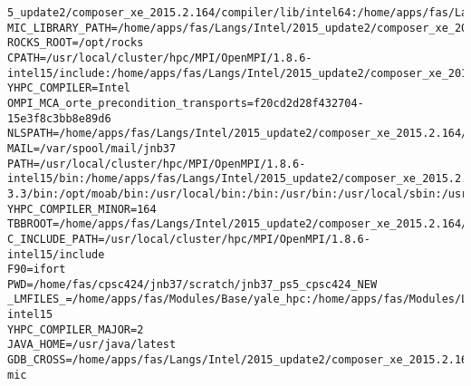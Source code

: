 \documentclass[11pt]{article}
\begin{document}
\begin{verbatim}
5_update2/composer_xe_2015.2.164/compiler/lib/intel64:/home/apps/fas/Langs/Intel/2015_update2/composer_xe_2015.2.164/mkl/lib/intel64:/home/apps/fas/Langs/Intel/2015_update2/composer_xe_2015.2.164/tbb/lib/intel64/gcc4.4:/home/apps/fas/Langs/Intel/2015_update2/composer_xe_2015.2.164/debugger/ipt/intel64/lib
MIC_LIBRARY_PATH=/home/apps/fas/Langs/Intel/2015_update2/composer_xe_2015.2.164/compiler/lib/mic:/home/apps/fas/Langs/Intel/2015_update2/composer_xe_2015.2.164/mpirt/lib/mic:/home/apps/fas/Langs/Intel/2015_update2/composer_xe_2015.2.164/tbb/lib/mic
ROCKS_ROOT=/opt/rocks
CPATH=/usr/local/cluster/hpc/MPI/OpenMPI/1.8.6-intel15/include:/home/apps/fas/Langs/Intel/2015_update2/composer_xe_2015.2.164/ipp/include:/home/apps/fas/Langs/Intel/2015_update2/composer_xe_2015.2.164/mkl/include:/home/apps/fas/Langs/Intel/2015_update2/composer_xe_2015.2.164/tbb/include
YHPC_COMPILER=Intel
OMPI_MCA_orte_precondition_transports=f20cd2d28f432704-15e3f8c3bb8e89d6
NLSPATH=/home/apps/fas/Langs/Intel/2015_update2/composer_xe_2015.2.164/compiler/lib/intel64/locale/%l_%t/%N:/home/apps/fas/Langs/Intel/2015_update2/composer_xe_2015.2.164/ipp/lib/intel64/locale/%l_%t/%N:/home/apps/fas/Langs/Intel/2015_update2/composer_xe_2015.2.164/mkl/lib/intel64/locale/%l_%t/%N:/home/apps/fas/Langs/Intel/2015_update2/composer_xe_2015.2.164/debugger/gdb/intel64_mic/share/locale/%l_%t/%N:/home/apps/fas/Langs/Intel/2015_update2/composer_xe_2015.2.164/debugger/gdb/intel64/share/locale/%l_%t/%N
MAIL=/var/spool/mail/jnb37
PATH=/usr/local/cluster/hpc/MPI/OpenMPI/1.8.6-intel15/bin:/home/apps/fas/Langs/Intel/2015_update2/composer_xe_2015.2.164/bin/intel64:/home/apps/fas/Langs/Intel/2015_update2/composer_xe_2015.2.164/mpirt/bin/intel64:/home/apps/fas/Langs/Intel/2015_update2/composer_xe_2015.2.164/debugger/gdb/intel64_mic/bin:/home/apps/fas/Langs/Intel/2015_update2/composer_xe_2015.2.164/debugger/gdb/intel64/bin:/home/apps/fas/Modules:/usr/lib64/qt-3.3/bin:/opt/moab/bin:/usr/local/bin:/bin:/usr/bin:/usr/local/sbin:/usr/sbin:/sbin:/usr/java/latest/bin:/opt/rocks/bin:/opt/rocks/sbin:/home/apps/bin:/home/fas/cpsc424/jnb37/bin
YHPC_COMPILER_MINOR=164
TBBROOT=/home/apps/fas/Langs/Intel/2015_update2/composer_xe_2015.2.164/tbb
C_INCLUDE_PATH=/usr/local/cluster/hpc/MPI/OpenMPI/1.8.6-intel15/include
F90=ifort
PWD=/home/fas/cpsc424/jnb37/scratch/jnb37_ps5_cpsc424_NEW
_LMFILES_=/home/apps/fas/Modules/Base/yale_hpc:/home/apps/fas/Modules/Langs/Intel/15:/home/apps/fas/Modules/MPI/OpenMPI/1.8.6-intel15
YHPC_COMPILER_MAJOR=2
JAVA_HOME=/usr/java/latest
GDB_CROSS=/home/apps/fas/Langs/Intel/2015_update2/composer_xe_2015.2.164/debugger/gdb/intel64_mic/bin/gdb-mic

\end{verbatim}
\end{document}
